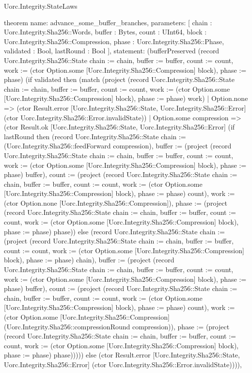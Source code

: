 \begin{lexlean}{Uorc.Integrity.StateLaws}
\begin{semanticmodule}
theorem{
  name: advance_some_buffer_branches,
  parameters: [
    chain : Uorc.Integrity.Sha256::Words,
    buffer : Bytes,
    count : UInt64,
    block : Uorc.Integrity.Sha256::Compression,
    phase : Uorc.Integrity.Sha256::Phase,
    validated : Bool,
    lastRound : Bool
  ],
  statement: (bufferPreserved (record Uorc.Integrity.Sha256::State {chain := chain, buffer := buffer, count := count, work := (ctor Option.some [Uorc.Integrity.Sha256::Compression] block), phase := phase}) (if validated then (match (project (record Uorc.Integrity.Sha256::State {chain := chain, buffer := buffer, count := count, work := (ctor Option.some [Uorc.Integrity.Sha256::Compression] block), phase := phase}) work)
    | Option.none => (ctor Result.error [Uorc.Integrity.Sha256::State, Uorc.Integrity.Sha256::Error] (ctor Uorc.Integrity.Sha256::Error.invalidState))
    | Option.some compression => (ctor Result.ok [Uorc.Integrity.Sha256::State, Uorc.Integrity.Sha256::Error] (if lastRound then (record Uorc.Integrity.Sha256::State {chain := (Uorc.Integrity.Sha256::feedForward compression), buffer := (project (record Uorc.Integrity.Sha256::State {chain := chain, buffer := buffer, count := count, work := (ctor Option.some [Uorc.Integrity.Sha256::Compression] block), phase := phase}) buffer), count := (project (record Uorc.Integrity.Sha256::State {chain := chain, buffer := buffer, count := count, work := (ctor Option.some [Uorc.Integrity.Sha256::Compression] block), phase := phase}) count), work := (ctor Option.none [Uorc.Integrity.Sha256::Compression]), phase := (project (record Uorc.Integrity.Sha256::State {chain := chain, buffer := buffer, count := count, work := (ctor Option.some [Uorc.Integrity.Sha256::Compression] block), phase := phase}) phase)}) else (record Uorc.Integrity.Sha256::State {chain := (project (record Uorc.Integrity.Sha256::State {chain := chain, buffer := buffer, count := count, work := (ctor Option.some [Uorc.Integrity.Sha256::Compression] block), phase := phase}) chain), buffer := (project (record Uorc.Integrity.Sha256::State {chain := chain, buffer := buffer, count := count, work := (ctor Option.some [Uorc.Integrity.Sha256::Compression] block), phase := phase}) buffer), count := (project (record Uorc.Integrity.Sha256::State {chain := chain, buffer := buffer, count := count, work := (ctor Option.some [Uorc.Integrity.Sha256::Compression] block), phase := phase}) count), work := (ctor Option.some [Uorc.Integrity.Sha256::Compression] (Uorc.Integrity.Sha256::compressionRound compression)), phase := (project (record Uorc.Integrity.Sha256::State {chain := chain, buffer := buffer, count := count, work := (ctor Option.some [Uorc.Integrity.Sha256::Compression] block), phase := phase}) phase)})))) else (ctor Result.error [Uorc.Integrity.Sha256::State, Uorc.Integrity.Sha256::Error] (ctor Uorc.Integrity.Sha256::Error.invalidState)))),
}
\end{semanticmodule}
\end{lexlean}
